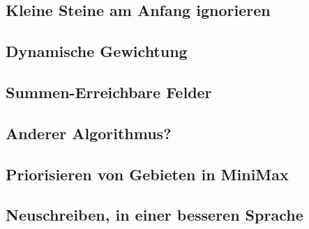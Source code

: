 \documentclass[12pt, draft]{beamer}
\begin{document}
\subsection{Kleine Steine am Anfang ignorieren} \begin{frame}\end{frame}
\subsection{Dynamische Gewichtung} \begin{frame}\end{frame}
\subsection{Summen-Erreichbare Felder} \begin{frame}\end{frame}
\subsection{Anderer Algorithmus?} \begin{frame}\end{frame}
\subsection{Priorisieren von Gebieten in MiniMax} \begin{frame}\end{frame}
\subsection{Neuschreiben, in einer besseren Sprache} \begin{frame}\end{frame}
\end{document}

